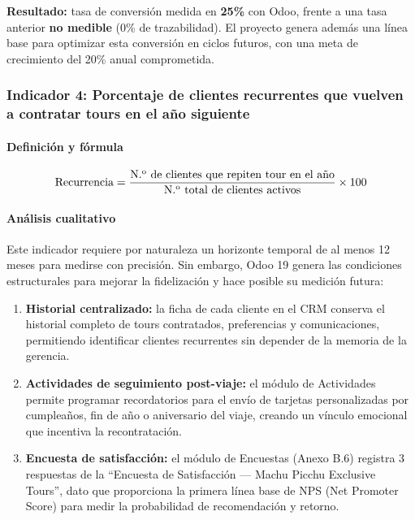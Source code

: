 \textbf{Resultado:} tasa de conversión medida en \textbf{25\%} con Odoo, frente a una tasa anterior \textbf{no medible} (0\% de trazabilidad). El proyecto genera además una línea base para optimizar esta conversión en ciclos futuros, con una meta de crecimiento del 20\% anual comprometida.

\subsubsection{Indicador 4: Porcentaje de clientes recurrentes que vuelven a contratar tours en el año siguiente}

\paragraph{Definición y fórmula}
\[
\text{Recurrencia} = \frac{\text{N.\textsuperscript{o} de clientes que repiten tour en el a\~{n}o}}{\text{N.\textsuperscript{o} total de clientes activos}} \times 100
\]

\paragraph{Análisis cualitativo}
Este indicador requiere por naturaleza un horizonte temporal de al menos 12 meses para medirse con precisión. Sin embargo, Odoo 19 genera las condiciones estructurales para mejorar la fidelización y hace posible su medición futura:

\begin{enumerate}
    \item \textbf{Historial centralizado:} la ficha de cada cliente en el CRM conserva el historial completo de tours contratados, preferencias y comunicaciones, permitiendo identificar clientes recurrentes sin depender de la memoria de la gerencia.
    \item \textbf{Actividades de seguimiento post-viaje:} el módulo de Actividades permite programar recordatorios para el envío de tarjetas personalizadas por cumpleaños, fin de año o aniversario del viaje, creando un vínculo emocional que incentiva la recontratación.
    \item \textbf{Encuesta de satisfacción:} el módulo de Encuestas (Anexo B.6) registra 3 respuestas de la ``Encuesta de Satisfacción --- Machu Picchu Exclusive Tours'', dato que proporciona la primera línea base de NPS (Net Promoter Score) para medir la probabilidad de recomendación y retorno.
\end{enumerate}

